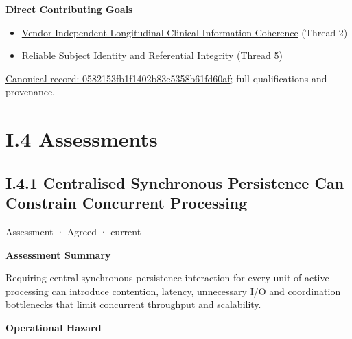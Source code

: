 \par\medskip\textbf{Direct Contributing Goals}\par


\begin{itemize}


\item \href{\detokenize{../../../../../docs/markdown/01-motivation/goals-outcomes/strategic-goals.md}}{Vendor-Independent Longitudinal Clinical Information Coherence} (Thread 2)

\item \href{\detokenize{../../../../../docs/markdown/01-motivation/goals-outcomes/strategic-goals.md}}{Reliable Subject Identity and Referential Integrity} (Thread 5)

\end{itemize}

{\footnotesize \href{../../../../continuum/motivation/outcome/0582153fb1f1402b83e5358b61fd60af.md}{Canonical record: 0582153fb1f1402b83e5358b61fd60af}; full qualifications and provenance.}\par
\chapter*{I.4 Assessments}
\label{navigation:I.4}

\section*{I.4.1 Centralised Synchronous Persistence Can Constrain Concurrent Processing}
\label{navigation:I.4.1}

\label{element:4f7b18cecb08415bad2b4247068a511e}
{\small Assessment · Agreed · current}\par

\par\medskip\textbf{Assessment Summary}\par


Requiring central synchronous persistence interaction for every unit of active processing can introduce contention, latency, unnecessary I/O and coordination bottlenecks that limit concurrent throughput and scalability.



\par\medskip\textbf{Operational Hazard}\par


